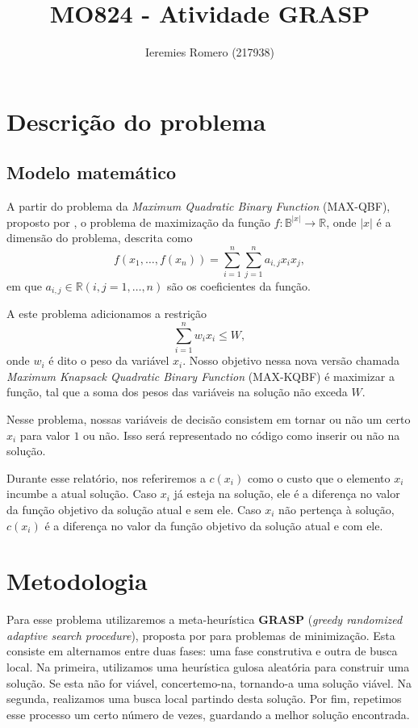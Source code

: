 \documentclass[11pt]{article}
\author{Ieremies Romero (217938)}
\date{}
\title{MO824 - Atividade GRASP}
\begin{document}
\maketitle
\section*{Descrição do problema}
\label{sec:orgaca3795}
\subsection*{Modelo matemático}
\label{sec:org4c9a73c}
A partir do problema da \emph{Maximum Quadratic Binary Function} (MAX-QBF), proposto por \cite{qbf},  o problema de maximização da função \(f: \mathbb{B}^{|x|} \to \mathbb{R}\), onde \(|x|\) é a dimensão do problema, descrita como
\[f(x_{1},\dots, f(x_{n})) = \sum \limits_{i=1}^{n} \sum \limits_{j=1}^{n} a_{i,j} x_{i} x_{j} ,\]
 em que \(a_{i,j} \in \mathbb{R} (i,j = 1,\dots,n)\) são os coeficientes da função.

A este problema adicionamos a restrição
\[ \sum_{i=1}^{n} w_{i} x_{i} \leq W ,\]
onde \(w_{i}\) é dito o peso da variável \(x_{i}\). Nosso objetivo nessa nova versão chamada \emph{Maximum Knapsack Quadratic Binary Function} (MAX-KQBF) é maximizar a função, tal que a soma dos pesos das variáveis na solução não exceda \(W\).

Nesse problema, nossas variáveis de decisão consistem em tornar ou não um certo \(x_{i}\) para valor \(1\) ou não. Isso será representado no código como inserir ou não na solução.

Durante esse relatório, nos referiremos a \(c(x_{i})\) como o custo que o elemento \(x_{i}\) incumbe a atual solução. Caso \(x_{i}\) já esteja na solução, ele é a diferença no valor da função objetivo da solução atual e sem ele. Caso \(x_{i}\) não pertença à solução, \(c(x_{i})\) é a diferença no valor da função objetivo da solução atual e com ele.
\section*{Metodologia}
\label{sec:orgb4cff69}
Para esse problema utilizaremos a meta-heurística \textbf{GRASP} (\emph{greedy randomized adaptive search procedure}), proposta por \cite{resende19_grasp} para problemas de minimização. Esta consiste em alternamos entre duas fases: uma fase construtiva e outra de busca local. Na primeira, utilizamos uma heurística gulosa aleatória para construir uma solução. Se esta não for viável, concertemo-na, tornando-a uma solução viável. Na segunda, realizamos uma busca local partindo desta solução. Por fim, repetimos esse processo um certo número de vezes, guardando a melhor solução encontrada.
\end{document}
